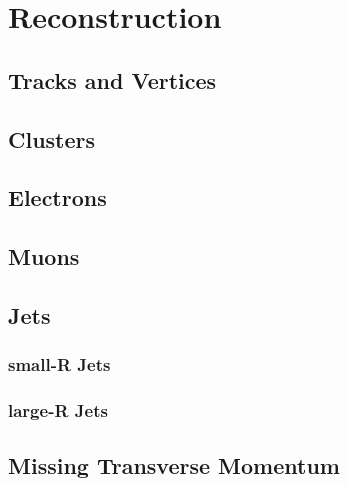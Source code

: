 \chapter{Reconstruction}
\section{Tracks and Vertices}
\section{Clusters}
\section{Electrons}
\section{Muons}
\section{Jets}
\subsection{small-R Jets}
\subsection{large-R Jets}
\section{Missing Transverse Momentum}

